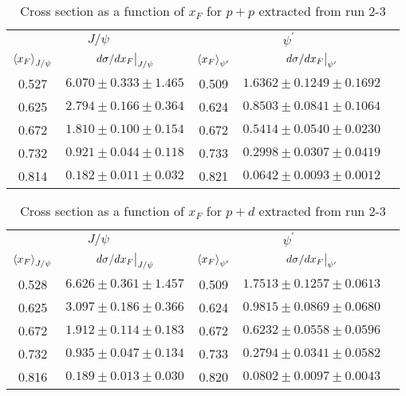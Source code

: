 \documentclass[../main.tex]{subfiles}
\begin{document}
\begin{table}[h!]
\centering
\caption{Cross section as a function of $x_F$ for $p+p$ extracted from run 2-3}
\begin{tabular}{cc|ccc}
\multicolumn{2}{c|}{$J/\psi$}                               & \multicolumn{2}{c}{$\psi^{\prime}$}                                &  \\ \cline{1-4}
$\expval{x_F}_{J/\psi}$    & $\eval{d\sigma/dx_F}_{J/\psi}$ & $\expval{x_F}_{\psi^\prime}$ & $\eval{d\sigma/dx_F}_{\psi^\prime}$ &  \\ \cline{1-4}
\multicolumn{1}{c|}{0.527} & $6.070\pm0.333\pm1.465$        & \multicolumn{1}{c|}{0.509}   & $1.6362\pm0.1249\pm0.1692$          &  \\
\multicolumn{1}{c|}{0.625} & $2.794\pm0.166\pm0.364$        & \multicolumn{1}{c|}{0.624}   & $0.8503\pm0.0841\pm0.1064$          &  \\
\multicolumn{1}{c|}{0.672} & $1.810\pm0.100\pm0.154$        & \multicolumn{1}{c|}{0.672}   & $0.5414\pm0.0540\pm0.0230$          &  \\
\multicolumn{1}{c|}{0.732} & $0.921\pm0.044\pm0.118$        & \multicolumn{1}{c|}{0.733}   & $0.2998\pm0.0307\pm0.0419$          &  \\
\multicolumn{1}{c|}{0.814} & $0.182\pm0.011\pm0.032$        & \multicolumn{1}{c|}{0.821}   & $0.0642\pm0.0093\pm0.0012$          &  \\ \cline{1-4}
\end{tabular}
\end{table}
\begin{table}[h!]
\centering
\caption{Cross section as a function of $x_F$ for $p+d$ extracted from run 2-3}
\begin{tabular}{cc|ccc}
\multicolumn{2}{c|}{$J/\psi$}                               & \multicolumn{2}{c}{$\psi^{\prime}$}                                &  \\ \cline{1-4}
$\expval{x_F}_{J/\psi}$    & $\eval{d\sigma/dx_F}_{J/\psi}$ & $\expval{x_F}_{\psi^\prime}$ & $\eval{d\sigma/dx_F}_{\psi^\prime}$ &  \\ \cline{1-4}
\multicolumn{1}{c|}{0.528} & $6.626\pm0.361\pm1.457$        & \multicolumn{1}{c|}{0.509}   & $1.7513\pm0.1257\pm0.0613$          &  \\
\multicolumn{1}{c|}{0.625} & $3.097\pm0.186\pm0.366$        & \multicolumn{1}{c|}{0.624}   & $0.9815\pm0.0869\pm0.0680$          &  \\
\multicolumn{1}{c|}{0.672} & $1.912\pm0.114\pm0.183$        & \multicolumn{1}{c|}{0.672}   & $0.6232\pm0.0558\pm0.0596$          &  \\
\multicolumn{1}{c|}{0.732} & $0.935\pm0.047\pm0.134$        & \multicolumn{1}{c|}{0.733}   & $0.2794\pm0.0341\pm0.0582$          &  \\
\multicolumn{1}{c|}{0.816} & $0.189\pm0.013\pm0.030$        & \multicolumn{1}{c|}{0.820}   & $0.0802\pm0.0097\pm0.0043$          &  \\ \cline{1-4}
\end{tabular}
\end{table}
\end{document}
